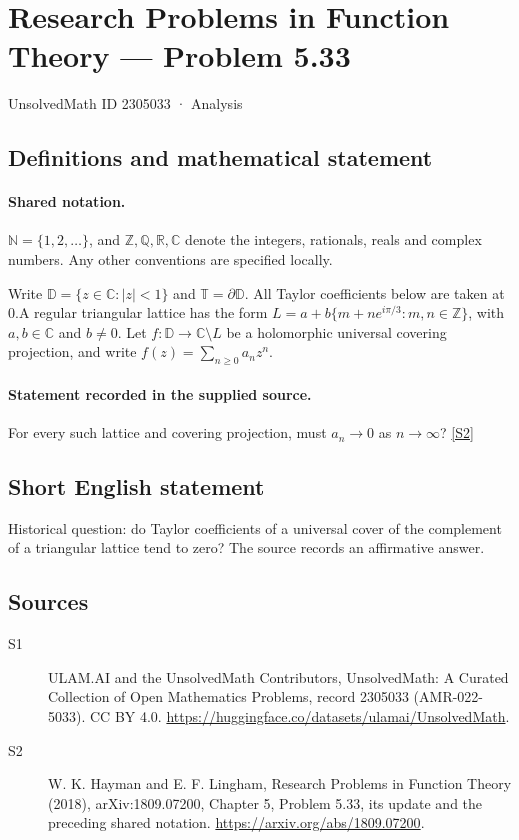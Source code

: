 \documentclass[11pt]{article}
\newcommand{\sref}[2]{\hyperlink{source:#1:#2}{[S#2]}}
\begin{document}
\setcounter{section}{2305032}
\section{Research Problems in Function Theory — Problem 5.33}\label{2305033}
{\small\sffamily UnsolvedMath ID 2305033 · Analysis}
\subsection{Definitions and mathematical statement}

\paragraph{Shared notation.}$\mathbb N=\{1,2,\ldots\}$, and $\mathbb Z,\mathbb Q,\mathbb R,\mathbb C$ denote the integers, rationals, reals and complex numbers. Any other conventions are specified locally.


Write $\mathbb D=\{z\in\mathbb C:|z|<1\}$ and $\mathbb T=\partial\mathbb D$. All Taylor coefficients below are taken at $0$.A regular triangular lattice has the form $L=a+b\{m+n e^{i\pi/3}:m,n\in\mathbb Z\}$, with $a,b\in\mathbb C$ and $b\ne0$. Let $f:\mathbb D\to\mathbb C\setminus L$ be a holomorphic universal covering projection, and write $f(z)=\sum_{n\ge0}a_nz^n$.
\paragraph{Statement recorded in the supplied source.}
For every such lattice and covering projection, must $a_n\to0$ as $n\to\infty$? \sref{2305033}{2}
\subsection{Short English statement}
Historical question: do Taylor coefficients of a universal cover of the complement of a triangular lattice tend to zero? The source records an affirmative answer.
\subsection{Sources}
\begin{description}
\item[\hypertarget{source:2305033:1}{S1}] ULAM.AI and the UnsolvedMath Contributors, UnsolvedMath: A Curated Collection of Open Mathematics Problems, record 2305033 (AMR-022-5033). CC BY 4.0. \url{https://huggingface.co/datasets/ulamai/UnsolvedMath}.
\item[\hypertarget{source:2305033:2}{S2}] W. K. Hayman and E. F. Lingham, Research Problems in Function Theory (2018), arXiv:1809.07200, Chapter 5, Problem 5.33, its update and the preceding shared notation. \url{https://arxiv.org/abs/1809.07200}.
\end{description}
\label{end:2305033}
\end{document}
